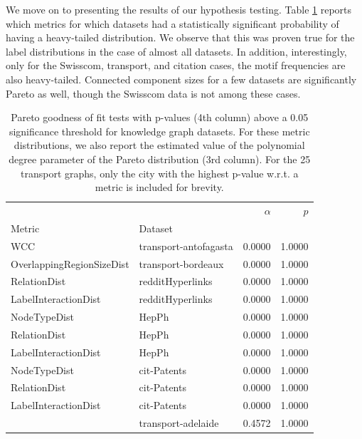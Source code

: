 We move on to presenting the results of our hypothesis testing. Table \ref{tab:pareto} reports which metrics for which datasets had a statistically significant probability of having a heavy-tailed distribution. We observe that this was proven true for the label distributions in the case of almost all datasets. In addition, interestingly, only for the Swisscom, transport, and citation cases, the motif frequencies are also heavy-tailed. Connected component sizes for a few datasets are significantly Pareto as well, though the Swisscom data is not among these cases.

\begin{table}[H]
    \centering
\caption[Pareto goodness of fit tests with p-values above a 0.05 significance threshold for knowledge graph datasets.]{Pareto goodness of fit tests with p-values (4th column) above a 0.05 significance threshold for knowledge graph datasets. For these metric distributions, we also report the estimated value of the polynomial degree parameter of the Pareto distribution (3rd column). For the 25 transport graphs, only the city with the highest p-value w.r.t. a metric is included for brevity.}
\label{tab:pareto}
\begin{tabular}{llrr}
\toprule
             &                   &  $\alpha$ &  $p$ \\
Metric & Dataset &              &               \\
\midrule
WCC & transport-antofagasta &       0.0000 &        1.0000 \\
OverlappingRegionSizeDist & transport-bordeaux &       0.0000 &        1.0000 \\
RelationDist & redditHyperlinks &       0.0000 &        1.0000 \\
LabelInteractionDist & redditHyperlinks &       0.0000 &        1.0000 \\
NodeTypeDist & HepPh &       0.0000 &        1.0000 \\
RelationDist & HepPh &       0.0000 &        1.0000 \\
LabelInteractionDist & HepPh &       0.0000 &        1.0000 \\
NodeTypeDist & cit-Patents &       0.0000 &        1.0000 \\
RelationDist & cit-Patents &       0.0000 &        1.0000 \\
LabelInteractionDist & cit-Patents &       0.0000 &        1.0000 \\
             & transport-adelaide &       0.4572 &        1.0000 \\

\end{tabular}
\end{table}
